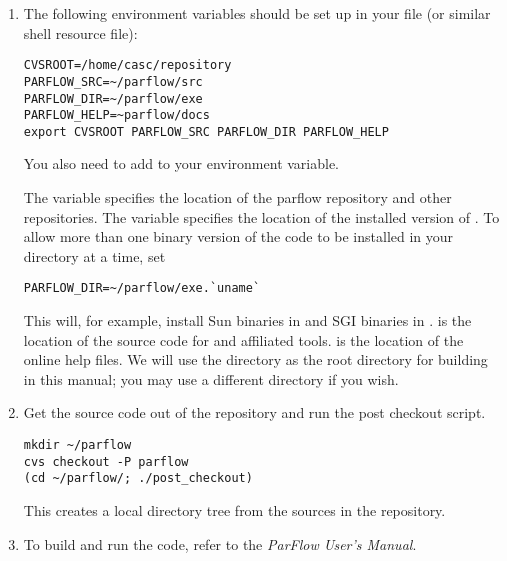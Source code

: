\begin{enumerate}

\item
The following environment variables should be set up in your 
file (or similar shell resource file):

\begin{display}\begin{verbatim}
CVSROOT=/home/casc/repository
PARFLOW_SRC=~/parflow/src
PARFLOW_DIR=~/parflow/exe
PARFLOW_HELP=~parflow/docs
export CVSROOT PARFLOW_SRC PARFLOW_DIR PARFLOW_HELP

\end{verbatim}\end{display}

You also need to add  to your 
 environment variable.

The variable  specifies the location of the parflow
repository and other  repositories.
The variable  specifies the location of
the installed version of \parflow{}.
To allow more than one binary version of the code to be installed in
your directory at a time, set
\begin{display}\begin{verbatim}
PARFLOW_DIR=~/parflow/exe.`uname`
\end{verbatim}\end{display}
This will, for example,
install Sun binaries in 
and SGI binaries in .
 is the location of the source code for \parflow{}
and affiliated tools.
 is the location of the online help files.
We will use the  directory as the root directory for
building \parflow{} in this manual; you may use a different directory
if you wish.


\item
Get the source code out of the repository and run the post checkout
script.

\begin{display}\begin{verbatim}
mkdir ~/parflow
cvs checkout -P parflow
(cd ~/parflow/; ./post_checkout)
\end{verbatim}\end{display}

This creates a local \parflow{} directory tree from the sources in 
the repository.

\item
To build and run the code, refer to the {\em ParFlow User's Manual}.

\end{enumerate}

